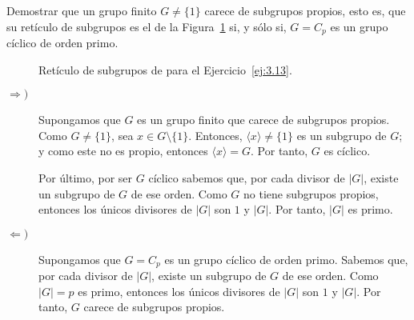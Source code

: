 \begin{ejercicio}\label{ej:3.13}
    Demostrar que un grupo finito $G \neq \{1\}$ carece de subgrupos propios, esto es, que su retículo de subgrupos es el de la Figura~\ref{fig:ej13} si, y sólo si, $G = C_p$ es un grupo cíclico de orden primo.
    \begin{figure}
        \centering
        \caption{Retículo de subgrupos de para el Ejercicio~\ref{ej:3.13}.}
        \label{fig:ej13}
    \end{figure}

    \begin{description}
        \item[$\Longrightarrow)$] Supongamos que $G$ es un grupo finito que carece de subgrupos propios. Como $G\neq \{1\}$, sea $x\in G\setminus \{1\}$. Entonces, $\langle x\rangle\neq \{1\}$ es un subgrupo de $G$; y como este no es propio, entonces $\langle x\rangle=G$. Por tanto, $G$ es cíclico.
        
        Por último, por ser $G$ cíclico sabemos que, por cada divisor de $|G|$, existe un subgrupo de $G$ de ese orden. Como $G$ no tiene subgrupos propios, entonces los únicos divisores de $|G|$ son $1$ y $|G|$. Por tanto, $|G|$ es primo.

        \item[$\Longleftarrow)$] Supongamos que $G=C_p$ es un grupo cíclico de orden primo. Sabemos que, por cada divisor de $|G|$, existe un subgrupo de $G$ de ese orden. Como $|G|=p$ es primo, entonces los únicos divisores de $|G|$ son $1$ y $|G|$. Por tanto, $G$ carece de subgrupos propios.
    \end{description}
\end{ejercicio}

